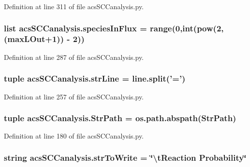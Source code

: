 Definition at line 311 of file acs\-S\-C\-Canalysis.\-py.

\hypertarget{a00128_a36f6b63269e716f42cd38a36a781a4cf}{
\subsubsection[{species\-In\-Flux}]{\setlength{\rightskip}{0pt plus 5cm}list acs\-S\-C\-Canalysis.\-species\-In\-Flux = range(0,int(pow(2,({\bf max\-L\-Out}+1)) -\/ 2))}}\label{a00128_a36f6b63269e716f42cd38a36a781a4cf}


Definition at line 287 of file acs\-S\-C\-Canalysis.\-py.

\hypertarget{a00128_a072631e11db72789389935b0f9efff8d}{
\subsubsection[{str\-Line}]{\setlength{\rightskip}{0pt plus 5cm}tuple acs\-S\-C\-Canalysis.\-str\-Line = {\bf line.\-split}('=')}}\label{a00128_a072631e11db72789389935b0f9efff8d}


Definition at line 257 of file acs\-S\-C\-Canalysis.\-py.

\hypertarget{a00128_af8add8b37a9c8a7825c0e8f0e7dfd6c1}{
\subsubsection[{Str\-Path}]{\setlength{\rightskip}{0pt plus 5cm}tuple acs\-S\-C\-Canalysis.\-Str\-Path = os.\-path.\-abspath(Str\-Path)}}\label{a00128_af8add8b37a9c8a7825c0e8f0e7dfd6c1}


Definition at line 180 of file acs\-S\-C\-Canalysis.\-py.

\hypertarget{a00128_a1966f0657c6b477eeb60bde732a201cc}{
\subsubsection[{str\-To\-Write}]{\setlength{\rightskip}{0pt plus 5cm}string acs\-S\-C\-Canalysis.\-str\-To\-Write = \char`\"{}\textbackslash{}t\-Reaction Probability\char`\"{}}}\label{a00128_a1966f0657c6b477eeb60bde732a201cc}


